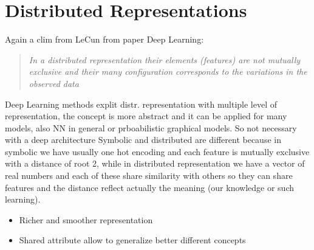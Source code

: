 \documentclass[12pt]{book}
\begin{document}
\section{Distributed Representations}
Again a clim from LeCun from paper Deep Learning:
\begin{quote}
	\textit{In a distributed representation their elements (features) are not mutually exclusive and their many configuration corresponds to the variations in the observed data}
\end{quote}
Deep Learning methods explit distr. representation with multiple level of representation, the concept is more abstract and it can be applied for many models, also NN in general or prboabilistic graphical models. So not necessary with a deep architecture\newline
Symbolic and distributed are different because in symbolic we have usually one hot encoding and each feature is mutually exclusive with a distance of root 2, while in distributed representation we have a vector of real numbers and each of these share similarity with others so they can share features and the distance reflect actually the meaning (our knowledge or such learning).\newline
\begin{itemize}
	\item Richer and smoother representation
	\item Shared attribute allow to generalize better different concepts
\end{itemize}
\end{document}
